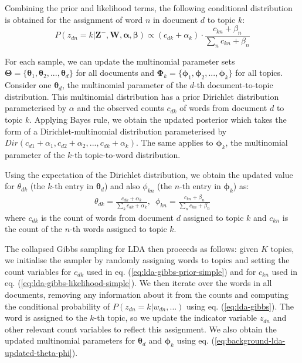 Combining the prior and likelihood terms, the following conditional distribution is obtained for the assignment of word $n$ in document $d$ to topic $k$:
\begin{equation}
P({z}_{dn}=k \vert \boldsymbol{Z}^{-}, \boldsymbol{W}, \boldsymbol{\alpha}, \boldsymbol{\beta}) \propto (c_{dk} + {\alpha}_k) \cdot \frac{ c_{kn} + {\beta}_n}{\sum_{n} c_{kn} + {\beta}_n}
\label{eq:lda-gibbs-combined}
\end{equation}

For each sample, we can update the multinomial parameter sets $\boldsymbol{\Theta}=\{\boldsymbol{\theta}_{1}, \boldsymbol{\theta}_{2}, ..., \boldsymbol{\theta}_{d}\}$ for all documents and $\boldsymbol{\Phi}_k=\{\boldsymbol{\phi}_1, \boldsymbol{\phi}_2, ..., \boldsymbol{\phi}_k\}$ for all topics. Consider one $\boldsymbol{\theta}_{d}$, the multinomial parameter of the $d$-th document-to-topic distribution. This multinomial distribution has a prior Dirichlet distribution parameterised by $\alpha$ and the observed counts $c_{dk}$ of words from document $d$ to topic $k$. Applying Bayes rule, we obtain the updated posterior which takes the form of a Dirichlet-multinomial distribution parameterised by $Dir(c_{d1}+{\alpha}_1, c_{d2}+{\alpha}_2, ...,c_{dk}+{\alpha}_k)$. The same applies to $\boldsymbol{\phi}_{k}$, the multinomial parameter of the $k$-th topic-to-word distribution.

Using the expectation of the Dirichlet distribution, we obtain the updated value for $\theta_{dk}$ (the $k$-th entry in ${\boldsymbol{\theta}_{d}}$) and also ${\phi}_{kn}$ (the $n$-th entry in $\boldsymbol{\phi}_{k}$) as:
\begin{align}
{\theta}_{dk} = \frac{c_{dk}+{\alpha}_k}{\sum_{k} c_{dk}+{\alpha}_k}, \enspace {\phi}_{kn} = \frac{c_{kn}+{\beta}_n}{\sum_{n} c_{kn}+{\beta}_n}
\label{eq:background-lda-updated-theta-phi}
\end{align}
where $c_{dk}$ is the count of words from document $d$ assigned to topic $k$ and $c_{kn}$ is the count of the $n$-th words assigned to topic $k$. 

The collapsed Gibbs sampling for LDA then proceeds as follows: given $K$ topics, we initialise the sampler by randomly assigning words to topics and setting the count variables for $c_{dk}$ used in eq. (\ref{eq:lda-gibbs-prior-simple}) and for $c_{kn}$ used in eq. (\ref{eq:lda-gibbs-likelihood-simple}). We then iterate over the words in all documents, removing any information about it from the counts and computing the conditional probability of $P({z}_{dn}=k \vert {w}_{dn}, ...)$ using eq. (\ref{eq:lda-gibbs}). The word is assigned to the $k$-th topic, so we update the indicator variable ${z}_{dn}$ and other relevant count variables to reflect this assignment. We also obtain the updated multinomial parameters for $\boldsymbol{\theta}_d$ and $\boldsymbol{\phi}_k$ using eq. (\ref{eq:background-lda-updated-theta-phi}).

